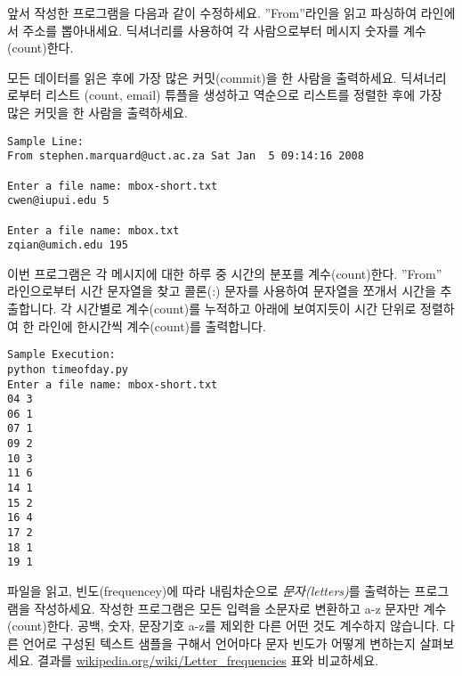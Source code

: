 \begin{ex}
앞서 작성한 프로그램을 다음과 같이 수정하세요.
''From''라인을 읽고 파싱하여 라인에서 주소를 뽑아내세요.
딕셔너리를 사용하여 각 사람으로부터 메시지 숫자를 계수(count)한다.

모든 데이터를 읽은 후에 가장 많은 커밋(commit)을 한 사람을 출력하세요.
딕셔너리로부터 리스트 (count, email) 튜플을 생성하고 역순으로 리스트를 정렬한 후에 가장 많은 커밋을 한 사람을 출력하세요.

\beforeverb
\begin{verbatim}
Sample Line:
From stephen.marquard@uct.ac.za Sat Jan  5 09:14:16 2008

Enter a file name: mbox-short.txt
cwen@iupui.edu 5

Enter a file name: mbox.txt
zqian@umich.edu 195
\end{verbatim}
\afterverb
\end{ex}
\begin{ex}

이번 프로그램은 각 메시지에 대한 하루 중 시간의 분포를 계수(count)한다.
''From'' 라인으로부터 시간 문자열을 찾고 콜론(:) 문자를 사용하여 문자열을 쪼개서 시간을 추출합니다.
각 시간별로 계수(count)를 누적하고 아래에 보여지듯이 시간 단위로 정렬하여 한 라인에 한시간씩 계수(count)를 출력합니다.

\beforeverb
\begin{verbatim}
Sample Execution:
python timeofday.py
Enter a file name: mbox-short.txt
04 3
06 1
07 1
09 2
10 3
11 6
14 1
15 2
16 4
17 2
18 1
19 1
\end{verbatim}
\afterverb
\end{ex}


\begin{ex}
파일을 읽고, 빈도(frequencey)에 따라 내림차순으로 {\em 문자(letters)}를 출력하는 프로그램을 작성하세요.
작성한 프로그램은 모든 입력을 소문자로 변환하고 a-z 문자만 계수(count)한다. 
공백, 숫자, 문장기호 a-z를 제외한 다른 어떤 것도 계수하지 않습니다.
다른 언어로 구성된 텍스트 샘플을 구해서 언어마다 문자 빈도가 어떻게 변하는지 살펴보세요.
결과를 \url{wikipedia.org/wiki/Letter_frequencies} 표와 비교하세요.


\end{ex}


